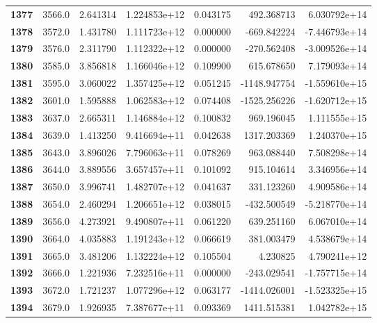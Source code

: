 \documentclass{report}[12pt]
\begin{document}
\begin{center}
\begin{tabular}{lrrrrrr}
\textbf{1377} &         3566.0 &   2.641314 &  1.224853e+12 &    0.043175 &   492.368713 &  6.030792e+14 \\
\textbf{1378} &         3572.0 &   1.431780 &  1.111723e+12 &    0.000000 &  -669.842224 & -7.446793e+14 \\
\textbf{1379} &         3576.0 &   2.311790 &  1.112322e+12 &    0.000000 &  -270.562408 & -3.009526e+14 \\
\textbf{1380} &         3585.0 &   3.856818 &  1.166046e+12 &    0.109900 &   615.678650 &  7.179093e+14 \\
\textbf{1381} &         3595.0 &   3.060022 &  1.357425e+12 &    0.051245 & -1148.947754 & -1.559610e+15 \\
\textbf{1382} &         3601.0 &   1.595888 &  1.062583e+12 &    0.074408 & -1525.256226 & -1.620712e+15 \\
\textbf{1383} &         3637.0 &   2.665311 &  1.146884e+12 &    0.100832 &   969.196045 &  1.111555e+15 \\
\textbf{1384} &         3639.0 &   1.413250 &  9.416694e+11 &    0.042638 &  1317.203369 &  1.240370e+15 \\
\textbf{1385} &         3643.0 &   3.896026 &  7.796063e+11 &    0.078269 &   963.088440 &  7.508298e+14 \\
\textbf{1386} &         3644.0 &   3.889556 &  3.657457e+11 &    0.101092 &   915.104614 &  3.346956e+14 \\
\textbf{1387} &         3650.0 &   3.996741 &  1.482707e+12 &    0.041637 &   331.123260 &  4.909586e+14 \\
\textbf{1388} &         3654.0 &   2.460294 &  1.206651e+12 &    0.038015 &  -432.500549 & -5.218770e+14 \\
\textbf{1389} &         3656.0 &   4.273921 &  9.490807e+11 &    0.061220 &   639.251160 &  6.067010e+14 \\
\textbf{1390} &         3664.0 &   4.035883 &  1.191243e+12 &    0.066619 &   381.003479 &  4.538679e+14 \\
\textbf{1391} &         3665.0 &   3.481206 &  1.132224e+12 &    0.105504 &     4.230825 &  4.790241e+12 \\
\textbf{1392} &         3666.0 &   1.221936 &  7.232516e+11 &    0.000000 &  -243.029541 & -1.757715e+14 \\
\textbf{1393} &         3672.0 &   1.721237 &  1.077296e+12 &    0.063177 & -1414.026001 & -1.523325e+15 \\
\textbf{1394} &         3679.0 &   1.926935 &  7.387677e+11 &    0.093369 &  1411.515381 &  1.042782e+15 \\

\end{tabular}
\end{center}
\end{document}

